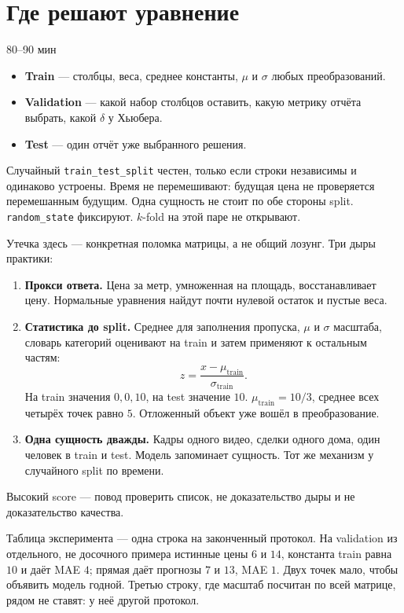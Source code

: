 \documentclass[11pt,a4paper]{article}
\newcommand{\term}[1]{\textbf{\color{navy}#1}}
\newcommand{\timing}[1]{\hfill{\small\color{blue}#1}}
\begin{document}
\section{Где решают уравнение}

\timing{80--90 мин}

\begin{itemize}
\item \term{Train} --- столбцы, веса, среднее константы, \(\mu\) и \(\sigma\) любых преобразований.
\item \term{Validation} --- какой набор столбцов оставить, какую метрику отчёта выбрать, какой \(\delta\) у Хьюбера.
\item \term{Test} --- один отчёт уже выбранного решения.
\end{itemize}

Случайный \texttt{train\_test\_split} честен, только если строки независимы и одинаково устроены. Время не перемешивают: будущая цена не проверяется перемешанным будущим. Одна сущность не стоит по обе стороны split. \texttt{random\_state} фиксируют. \(k\)-fold на этой паре не открывают.

Утечка здесь --- конкретная поломка матрицы, а не общий лозунг. Три дыры практики:

\begin{enumerate}
\item \term{Прокси ответа.} Цена за метр, умноженная на площадь, восстанавливает цену. Нормальные уравнения найдут почти нулевой остаток и пустые веса.
\item \term{Статистика до split.} Среднее для заполнения пропуска, \(\mu\) и \(\sigma\) масштаба, словарь категорий оценивают на train и затем применяют к остальным частям:
\[
z=\frac{x-\mu_{\mathrm{train}}}{\sigma_{\mathrm{train}}}.
\]
На train значения \(0,0,10\), на test значение \(10\). \(\mu_{\mathrm{train}}=10/3\), среднее всех четырёх точек равно \(5\). Отложенный объект уже вошёл в преобразование.
\item \term{Одна сущность дважды.} Кадры одного видео, сделки одного дома, один человек в train и test. Модель запоминает сущность. Тот же механизм у случайного split по времени.
\end{enumerate}

Высокий score --- повод проверить список, не доказательство дыры и не доказательство качества.

Таблица эксперимента --- одна строка на законченный протокол. На validation из отдельного, не досочного примера истинные цены \(6\) и \(14\), константа train равна \(10\) и даёт MAE \(4\); прямая даёт прогнозы \(7\) и \(13\), MAE \(1\). Двух точек мало, чтобы объявить модель годной. Третью строку, где масштаб посчитан по всей матрице, рядом не ставят: у неё другой протокол.
\end{document}

